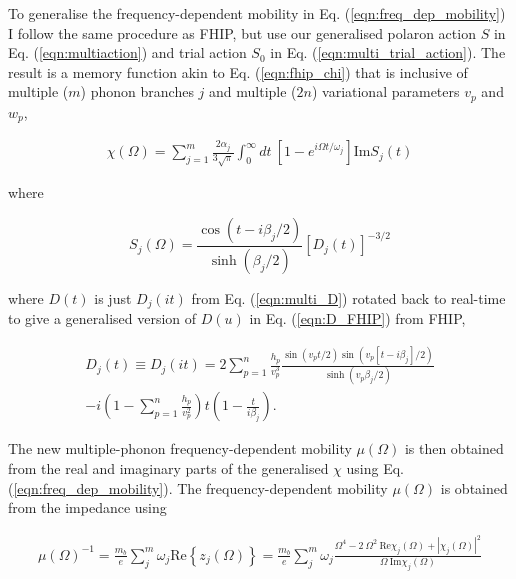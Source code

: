 To generalise the frequency-dependent mobility in Eq. (\ref{eqn:freq_dep_mobility}) I follow the same procedure as FHIP, but use our generalised polaron action $S$ in Eq. (\ref{eqn:multiaction}) and trial action $S_0$ in Eq. (\ref{eqn:multi_trial_action}). The result is a memory function akin to Eq. (\ref{eqn:fhip_chi}) that is inclusive of multiple ($m$) phonon branches $j$ and multiple ($2n$) variational parameters $v_{p}$ and $w_{p}$,

\begin{equation} \label{eqn:multi_memory}
    \begin{gathered}
        \chi(\Omega) = \sum_{j=1}^m \frac{2\alpha_j}{3\sqrt{\pi}} \int_0^{\infty} dt\ \left[1 - e^{i\Omega t / \omega_j}\right] \textrm{Im} S_j(t)
    \end{gathered}
\end{equation}

where

\begin{equation}
    S_j(\Omega) = \frac{\cos \left(t - i\beta_j/2\right)}{\sinh (\beta_j/2)} [D_j(t)]^{-3/2}
\end{equation}

where $D(t)$ is just $D_j(it)$ from Eq. (\ref{eqn:multi_D}) rotated back to real-time to give a generalised version of $D(u)$ in Eq. (\ref{eqn:D_FHIP}) from FHIP,

\begin{equation}
    \begin{gathered}
        D_j(t) \equiv D_j(it) = 2\sum_{p=1}^n \frac{h_p}{v_{p}^3} \frac{\sin(v_{p} t/2) \sin(v_{p}[t-i\beta_j]/2)}{\sinh(v_{p}\beta_j/2)} \\
        -i \left(1-\sum_{p=1}^n\frac{h_{p}}{v_{p}^2}\right) t \left(1 - \frac{t}{i\beta_j}\right).
    \end{gathered}
\end{equation}

The new multiple-phonon frequency-dependent mobility $\mu(\Omega)$ is then obtained from the real and imaginary parts of the generalised $\chi$ using Eq. (\ref{eqn:freq_dep_mobility}). The frequency-dependent mobility $\mu(\Omega)$ is obtained from the impedance using

\begin{equation}\label{eqn:freq_dep_mobility}
\begin{gathered}
    \mu(\Omega)^{-1} = \frac{m_b}{e} \sum_j^m \omega_j \textrm{Re}\left\{z_j(\Omega)\right\}
    = \frac{m_b}{e} \sum_j^m \omega_j \frac{\Omega^4 - 2\ \Omega^2\  \textrm{Re}\chi_j(\Omega) + |\chi_j(\Omega)|^2}{\Omega\ \textrm{Im}\chi_j(\Omega)}
    \end{gathered}
\end{equation}

